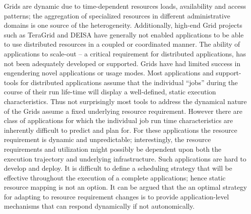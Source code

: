 \documentclass[conference,final]{IEEEtran}
\begin{document}


Grids are dynamic due to time-dependent resources loads, availability
and access patterns; the aggregation of specialized resources in
different administrative domains is one source of the heterogeneity.
Additionally, high-end Grid projects such as TeraGrid and DEISA have
generally not enabled applications to be able to use distributed
resources in a coupled or coordinated manner. The ability of
applications to scale-out -- a critical requirement for distributed
applications, has not been adequately developed or supported. Grids
have had limited success in engendering novel applications or usage
modes.  Most applications and support-tools for distributed
applications assume that the individual ``jobs'' during the course of
their run life-time will display a well-defined, static execution
characteristics.  Thus not surprisingly most tools to address the
dynamical nature of the Grids assume a fixed underlying resource
requirement.  However there are class of applications for which the
individual job run time characteristics are inherently difficult to
predict and plan for. For these applications the resource requirement
is dynamic and unpredictable; interestingly, the resource requirements
and utilization might possibly be dependent upon both the execution
trajectory and underlying infrastructure. Such applications are hard
to develop and deploy. It is difficult to define a scheduling strategy
that will be effective throughout the execution of a complete
applications; hence static resource mapping is not an option.  It can
be argued that the an optimal strategy for adapting to resource
requirement changes is to provide application-level mechanisms that
can respond dynamically if not autonomically.
\end{document}
